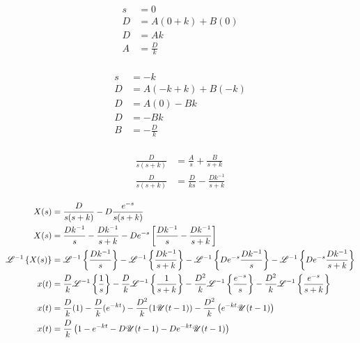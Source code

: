 \documentclass[
	date={September 16{,} 2024}
]{math486notes}
\begin{document}
\begin{minipage}[t]{0.5\textwidth}
	\begin{equation*}
	\begin{aligned}
		s &= 0\\
		D &= A(0+k) + B(0)\\
		D &= Ak\\
		A &= \frac{D}{k}\\
	\end{aligned}
	\end{equation*}
\end{minipage}%
\begin{minipage}[t]{0.5\textwidth}
	\begin{equation*}
	\begin{aligned}
		s &= -k\\
		D &= A(-k+k) + B(-k)\\
		D &= A(0) - Bk\\
		D &= -Bk\\
		B &= -\frac{D}{k}\\
	\end{aligned}
	\end{equation*}
\end{minipage}
\begin{equation*}
\begin{aligned}
	\frac{D}{s(s+k)} &= \frac{A}{s} + \frac{B}{s+k}\\
	\frac{D}{s(s+k)} &= \frac{D}{ks} - \frac{Dk^{-1}}{s+k}\\
\end{aligned}
\end{equation*}
\begin{equation*}
\begin{aligned}
	X(s) &= \frac{D}{s(s+k)} - D\frac{e^{-s}}{s(s+k)}\\
	X(s) &= \frac{Dk^{-1}}{s} - \frac{Dk^{-1}}{s+k} - De^{-s}\left[ \frac{Dk^{-1}}{s} - \frac{Dk^{-1}}{s+k} \right]\\
	\laplacei[X(s)] &= \laplacei[\frac{Dk^{-1}}{s}] - \laplacei[\frac{Dk^{-1}}{s+k}] - \laplacei[De^{-s}\frac{Dk^{-1}}{s}] - \laplacei[De^{-s}\frac{Dk^{-1}}{s+k}]\\
	x(t) &= \frac{D}{k}\laplacei[\frac{1}{s}] - \frac{D}{k}\laplacei[\frac{1}{s+k}] - \frac{D^{2}}{k}\laplacei[\frac{e^{-s}}{s}] - \frac{D^{2}}{k}\laplacei[\frac{e^{-s}}{s+k}]\\
	x(t) &= \frac{D}{k}(1) - \frac{D}{k}(e^{-kt}) - \frac{D^{2}}{k}(1\unitstep(t-1)) - \frac{D^{2}}{k}\left( e^{-kt}\unitstep(t-1) \right)\\
	x(t) &= \frac{D}{k}\left(1 - e^{-kt} - D\unitstep(t-1) - De^{-kt}\unitstep(t-1) \right)\\
\end{aligned}
\end{equation*}
\end{document}
